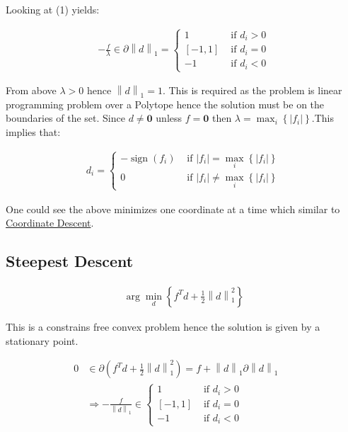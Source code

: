 \documentclass[]{article}
\DeclareMathOperator{\sign}{sign}
\newcommand{\MyParen}[1]{\left( #1 \right)}
\newcommand{\MyBrack}[1]{\left\lbrack #1 \right\rbrack}
\newcommand{\MyBrace}[1]{\left\lbrace #1 \right\rbrace}
\newcommand{\MyNorm}[2]{{\left\| #1 \right\|}_{#2}}
\newcommand{\MyNormSqr}[2]{{\left\| #1 \right\|}_{#2}^{2}}
\newcommand{\MyAbs}[1]{\left| #1 \right|}
\begin{document}
	Looking at (1) yields:
	
	\begin{align*}
	- \frac{f}{\lambda} \in \partial \MyNorm{d}{1} = \begin{cases} 1 & \text{ if } {d}_{i} > 0 \\ \MyBrack{-1, 1} & \text{ if } {d}_{i} = 0 \\ -1 & \text{ if } {d}_{i} < 0 \end{cases}
	\end{align*}
	
	From above $ \lambda > 0 $ hence $ \MyNorm{d}{1} = 1 $. This is required as the problem is linear programming problem over a Polytope hence the solution must be on the boundaries of the set. Since $ d \neq \boldsymbol{0} $ unless $ f = \boldsymbol{0} $ then $ \lambda = \max_{i} \MyBrace{ \MyAbs{ {f}_{i} } } $.This implies that:
	
	\begin{align*}
	{d}_{i} = \begin{cases} -\sign \MyParen{{f}_{i}} & \text{ if } \MyAbs{ {f}_{i} } = \max_{i} \MyBrace{ \MyAbs{ {f}_{i} } } \\ 0 & \text{ if } \MyAbs{ {f}_{i} } \neq \max_{i} \MyBrace{ \MyAbs{ {f}_{i} } } \end{cases}
	\end{align*}
	
	One could see the above minimizes one coordinate at a time which similar to \href{https://en.wikipedia.org/wiki/Coordinate_descent}{Coordinate Descent}.
	
	\subsection{Steepest Descent}
	
	\begin{align*}
	\arg \min_{ d } \MyBrace{ {f}^{T} d + \frac{1}{2} \MyNormSqr{d}{1} }
	\end{align*}
	
	This is a constrains free convex problem hence the solution is given by a stationary point.
	
	\begin{align*}
	0 & \in \partial \MyParen{{f}^{T} d + \frac{1}{2} \MyNormSqr{d}{1}} = f + \MyNorm{d}{1} \partial \MyNorm{d}{1} && \text{} \\
	& \Rightarrow - \frac{f}{ \MyNorm{d}{1} } \in \begin{cases} 1 & \text{ if } {d}_{i} > 0 \\ \MyBrack{-1, 1} & \text{ if } {d}_{i} = 0 \\ -1 & \text{ if } {d}_{i} < 0 \end{cases}
	\end{align*}
	
\end{document}
